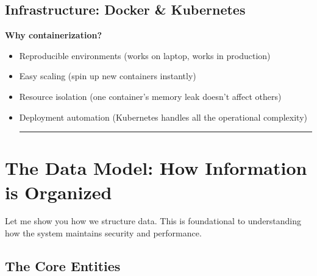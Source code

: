 \documentclass[11pt,a4paper]{report}
\begin{document}
\section{Infrastructure: Docker \& Kubernetes}


\textbf{Why containerization?}
\begin{itemize}
\item Reproducible environments (works on laptop, works in production)
\item Easy scaling (spin up new containers instantly)
\item Resource isolation (one container's memory leak doesn't affect others)
\item Deployment automation (Kubernetes handles all the operational complexity)


\vfill\hrule\vfill


\end{itemize}

\chapter{The Data Model: How Information is Organized}


Let me show you how we structure data. This is foundational to understanding how the system maintains security and performance.


\section{The Core Entities}
\end{document}
